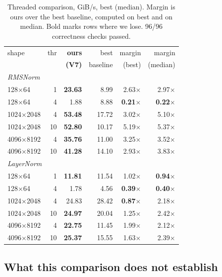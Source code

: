 \documentclass[conference,10pt]{IEEEtran}
\begin{document}
\begin{table}[t]
\caption{Threaded comparison, GiB/s, best (median). Margin is ours over the best
baseline, computed on best and on median. Bold marks rows where we lose.
96/96 correctness checks passed.}
\label{tab:threaded}
\centering
\small
\begin{tabular}{lrrrrr}
\toprule
shape & thr & \textbf{ours} & best & margin & margin \\
      &     & \textbf{(V7)} & baseline & (best) & (median) \\
\midrule
\multicolumn{6}{l}{\emph{RMSNorm}} \\
128$\times$64     & 1  & \textbf{23.63} & 8.99  & 2.63$\times$ & 2.97$\times$ \\
128$\times$64     & 4  & 1.88  & 8.88  & \textbf{0.21$\times$} & \textbf{0.22$\times$} \\
1024$\times$2048  & 4  & \textbf{53.48} & 17.72 & 3.02$\times$ & 5.10$\times$ \\
1024$\times$2048  & 10 & \textbf{52.80} & 10.17 & 5.19$\times$ & 5.37$\times$ \\
4096$\times$8192  & 4  & \textbf{35.76} & 11.00 & 3.25$\times$ & 3.52$\times$ \\
4096$\times$8192  & 10 & \textbf{41.28} & 14.10 & 2.93$\times$ & 3.83$\times$ \\
\midrule
\multicolumn{6}{l}{\emph{LayerNorm}} \\
128$\times$64     & 1  & \textbf{11.81} & 11.54 & 1.02$\times$ & \textbf{0.94$\times$} \\
128$\times$64     & 4  & 1.78  & 4.56  & \textbf{0.39$\times$} & \textbf{0.40$\times$} \\
1024$\times$2048  & 4  & 24.83 & 28.42 & \textbf{0.87$\times$} & 2.18$\times$ \\
1024$\times$2048  & 10 & \textbf{24.97} & 20.04 & 1.25$\times$ & 2.42$\times$ \\
4096$\times$8192  & 4  & \textbf{22.75} & 11.45 & 1.99$\times$ & 2.12$\times$ \\
4096$\times$8192  & 10 & \textbf{25.37} & 15.55 & 1.63$\times$ & 2.39$\times$ \\
\bottomrule
\end{tabular}
\end{table}

\subsection{What this comparison does not establish}
\end{document}
